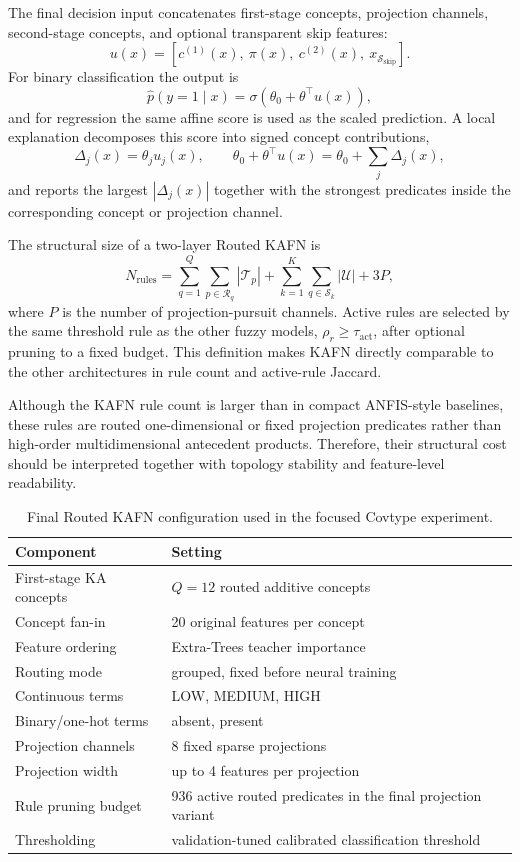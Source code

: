 \documentclass[runningheads]{llncs}
\begin{document}
The final decision input concatenates first-stage concepts, projection channels, second-stage concepts, and optional transparent skip features:
\[
u(x)=
\left[c^{(1)}(x),\ \pi(x),\ c^{(2)}(x),\ x_{\mathcal{S}_{\mathrm{skip}}}\right].
\]
For binary classification the output is
\[
\hat{p}(y=1\mid x)=
\sigma\!\left(\theta_0+\theta^\top u(x)\right),
\]
and for regression the same affine score is used as the scaled prediction. A local explanation decomposes this score into signed concept contributions,
\[
\Delta_j(x)=\theta_j u_j(x),
\qquad
\theta_0+\theta^\top u(x)=\theta_0+\sum_j \Delta_j(x),
\]
and reports the largest $|\Delta_j(x)|$ together with the strongest predicates inside the corresponding concept or projection channel.

The structural size of a two-layer Routed KAFN is
\[
N_{\mathrm{rules}} =
\sum_{q=1}^{Q}\sum_{p\in\mathcal{R}_q}|\mathcal{T}_p|
+ \sum_{k=1}^{K}\sum_{q\in\mathcal{S}_k}|\mathcal{U}|
+ 3P,
\]
where $P$ is the number of projection-pursuit channels. Active rules are selected by the same threshold rule as the other fuzzy models, $\rho_r\ge\tau_{\mathrm{act}}$, after optional pruning to a fixed budget. This definition makes KAFN directly comparable to the other architectures in rule count and active-rule Jaccard.

Although the KAFN rule count is larger than in compact ANFIS-style baselines, these rules are routed one-dimensional or fixed projection predicates rather than high-order multidimensional antecedent products. Therefore, their structural cost should be interpreted together with topology stability and feature-level readability.

\begin{table}[H]
\centering
\caption{Final Routed KAFN configuration used in the focused Covtype experiment.}
\label{tab:kafn_config}
\scriptsize
\setlength{\tabcolsep}{5pt}
\begin{tabular}{ll}
\toprule
Component & Setting \\
\midrule
First-stage KA concepts & $Q=12$ routed additive concepts \\
Concept fan-in & 20 original features per concept \\
Feature ordering & Extra-Trees teacher importance \\
Routing mode & grouped, fixed before neural training \\
Continuous terms & LOW, MEDIUM, HIGH \\
Binary/one-hot terms & absent, present \\
Projection channels & 8 fixed sparse projections \\
Projection width & up to 4 features per projection \\
Rule pruning budget & 936 active routed predicates in the final projection variant \\
Thresholding & validation-tuned calibrated classification threshold \\
\bottomrule
\end{tabular}
\end{table}
\end{document}

